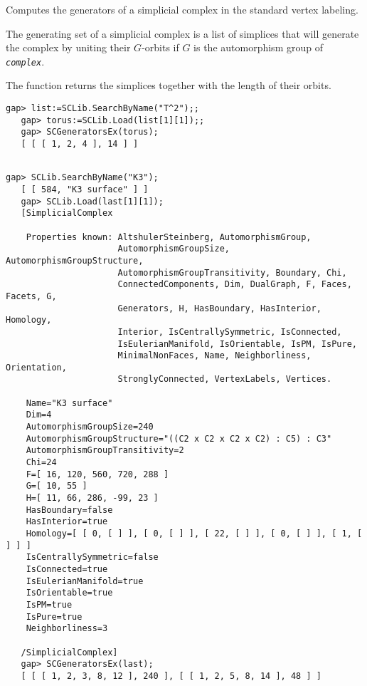 \documentclass[a4paper,11pt]{report}
\begin{document}
{{{ Computes the generators of a simplicial complex in the standard vertex
labeling.

 The generating set of a simplicial complex is a list of simplices that will
generate the complex by uniting their $G$-orbits if $G$ is the automorphism group of \mbox{\texttt{\mdseries\slshape complex}}.

 The function returns the simplices together with the length of their orbits. 
\begin{Verbatim}[commandchars=!@|,fontsize=\small,frame=single,label=Example]
   gap> list:=SCLib.SearchByName("T^2");;
   gap> torus:=SCLib.Load(list[1][1]);;
   gap> SCGeneratorsEx(torus); 
   [ [ [ 1, 2, 4 ], 14 ] ]
   
\end{Verbatim}
 
\begin{Verbatim}[commandchars=!@|,fontsize=\small,frame=single,label=Example]
   gap> SCLib.SearchByName("K3");
   [ [ 584, "K3 surface" ] ]
   gap> SCLib.Load(last[1][1]);
   [SimplicialComplex
   
    Properties known: AltshulerSteinberg, AutomorphismGroup, 
                      AutomorphismGroupSize, AutomorphismGroupStructure, 
                      AutomorphismGroupTransitivity, Boundary, Chi, 
                      ConnectedComponents, Dim, DualGraph, F, Faces, Facets, G, 
                      Generators, H, HasBoundary, HasInterior, Homology, 
                      Interior, IsCentrallySymmetric, IsConnected, 
                      IsEulerianManifold, IsOrientable, IsPM, IsPure, 
                      MinimalNonFaces, Name, Neighborliness, Orientation, 
                      StronglyConnected, VertexLabels, Vertices.
   
    Name="K3 surface"
    Dim=4
    AutomorphismGroupSize=240
    AutomorphismGroupStructure="((C2 x C2 x C2 x C2) : C5) : C3"
    AutomorphismGroupTransitivity=2
    Chi=24
    F=[ 16, 120, 560, 720, 288 ]
    G=[ 10, 55 ]
    H=[ 11, 66, 286, -99, 23 ]
    HasBoundary=false
    HasInterior=true
    Homology=[ [ 0, [ ] ], [ 0, [ ] ], [ 22, [ ] ], [ 0, [ ] ], [ 1, [ ] ] ]
    IsCentrallySymmetric=false
    IsConnected=true
    IsEulerianManifold=true
    IsOrientable=true
    IsPM=true
    IsPure=true
    Neighborliness=3
   
   /SimplicialComplex]
   gap> SCGeneratorsEx(last);
   [ [ [ 1, 2, 3, 8, 12 ], 240 ], [ [ 1, 2, 5, 8, 14 ], 48 ] ]
   
\end{Verbatim}
 }

}}
\end{document}
